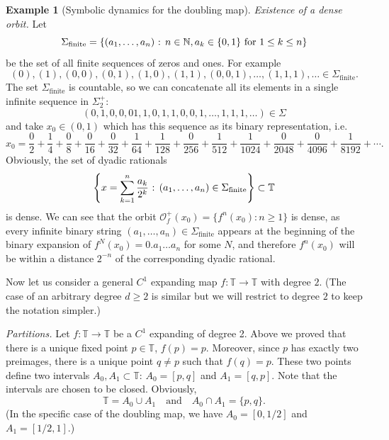 \documentclass[12pt]{article}
\theoremstyle{definition}
\newtheorem{example}[theorem]{Example}
\theoremstyle{remark}
\begin{document}
\begin{example}[Symbolic dynamics for the doubling map]
\medskip
\noindent
{\it Existence of a dense orbit.}
Let
\[
\Sigma_{\mathrm{finite}}= \left\{(a_1,\ldots,a_n) \hbox{ : } n \in \mathbb N, a_k \in \{0,1\} \ \text{for} \ 1 \le k \le n
\right\}\]
be the set of all finite sequences of zeros and ones.
For example
\[
(0),(1),(0,0), (0,1), (1,0),(1,1), (0,0,1), \ldots,(1,1,1), \ldots \in \Sigma_{\mathrm{finite}}.
\]
The set $\Sigma_{\mathrm{finite}}$ is countable, so we can concatenate all its elements in a single infinite
sequence in $\Sigma_2^+$:
\[
(0,1,0,0,01,1,0,1,1,0,0,1,\dots,1,1,1,\ldots) \in \Sigma
\]
and take $x_0 \in (0,1)$ which has this sequence as its binary representation, i.e.
\[
x_0 = \frac{0}{2} + \frac{1}{4} + \frac{0}{8} +\frac{0}{16} +\frac{0}{32}
+\frac{1}{64} + \frac{1}{128} + \frac{0}{256} + \frac{1}{512} + \frac{1}{1024}
+ \frac{0}{2048} + \frac{0}{4096} + \frac{1}{8192} +\cdots .
\]
Obviously, the set of dyadic rationals
\[
\left\{x = \sum_{k=1}^n \frac{a_k}{2^k} \hbox{ : } (a_1,\ldots,a_n) \in \Sigma_{\mathrm{finite}} \right\} 
\subset \mathbb T
\]
is dense. We can see that the orbit $\mathcal O_f^+(x_0) = \{f^n(x_0) : n \ge 1\}$ is dense, as every infinite 
binary string $(a_1,\ldots,a_n) \in \Sigma_{\mathrm{finite}}$ appears at the beginning of the binary
expansion of $f^N(x_0) = 0.a_1 \ldots a_n$ for some $N$, and therefore $f^n(x_0)$ will be within a distance 
$2^{-n}$ of the corresponding dyadic rational.
\end{example}

Now let us consider a general $C^1$ expanding map $f : \mathbb T \to \mathbb T$ with degree $2$.
(The case of an arbitrary degree $d \ge 2$ is similar but we will restrict to degree $2$ to keep the notation
simpler.)

\medskip
\noindent
{\it Partitions.}
Let $f : \mathbb T \to \mathbb T$  be a $C^1$ expanding of degree 2. Above we proved that
there is a unique fixed point $p \in \mathbb T$, $f(p) = p$. Moreover, since $p$ has exactly two preimages, there
is a unique point $q \ne p$ such that $f(q) = p$. These two points define two intervals $A_0,A_1 \subset
\mathbb T$:
$A_0 = [p,q]$ and $A_1 = [q,p]$. Note that the intervals are chosen to be closed. Obviously,
\[
\mathbb T = A_0 \cup A_1 \quad \text{and} \quad  A_0 \cap A_1 = \{p,q\}.
\]
(In the specific case of the doubling map, we have $A_0= [0,1/2]$ and $A_1 =[1/2,1]$.)
\end{document}
